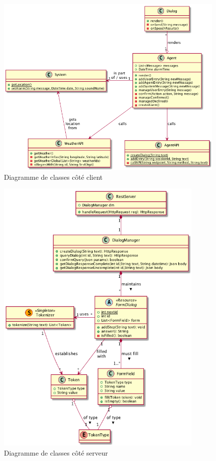\begin{figure}[!h]
    \centering
    \includegraphics[width=1.1\textwidth,center]{../docs/conception/build/classDiagram_Client.png}
    \caption{Diagramme de classes côté client}
    \label{class-diagram-client}
\end{figure}

\begin{figure}[!h]
    \centering
    \includegraphics[width=0.9\textwidth]{../docs/conception/build/classDiagram_Server.png}
    \caption{Diagramme de classes côté serveur}
    \label{class-diagram-server}
\end{figure}


